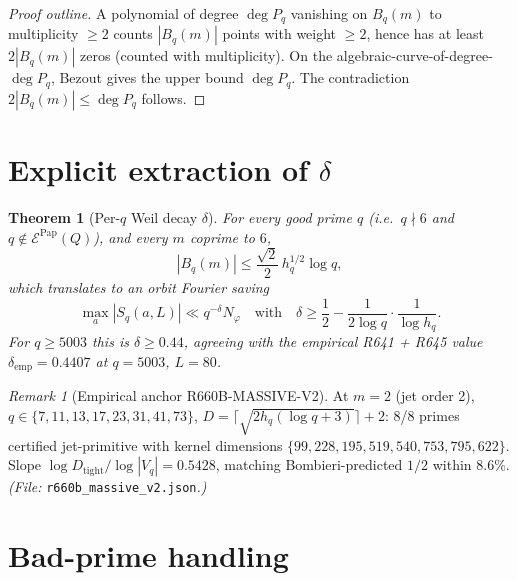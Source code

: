 \documentclass[12pt]{amsart}
\newtheorem{theorem}{Theorem}
\theoremstyle{definition}
\theoremstyle{remark}
\newtheorem{remark}{Remark}
\begin{document}
\begin{proof}[Proof outline]
A polynomial of degree $\deg P_q$ vanishing on $B_q(m)$ to multiplicity
$\ge 2$ counts $|B_q(m)|$ points with weight $\ge 2$, hence has at
least $2 |B_q(m)|$ zeros (counted with multiplicity). On the
algebraic-curve-of-degree-$\deg P_q$, Bezout gives the upper bound
$\deg P_q$. The contradiction $2|B_q(m)| \le \deg P_q$ follows.
\qedhere
\end{proof}

\section{Explicit extraction of $\delta$}

\begin{theorem}[Per-$q$ Weil decay $\delta$]
For every good prime $q$ (i.e.\ $q \nmid 6$ and $q \notin \mathcal{E}^{\mathrm{Pap}}(Q)$), and every $m$ coprime to $6$,
$$
|B_q(m)| \le \frac{\sqrt{2}}{2}\, h_q^{1/2} \log q,
$$
which translates to an orbit Fourier saving
$$
\max_a |S_q(a, L)| \ll q^{-\delta} N_\varphi
\quad\text{with}\quad \delta \ge \frac{1}{2} - \frac{1}{2\log q}\cdot\frac{1}{\log h_q}.
$$
For $q \ge 5003$ this is $\delta \ge 0.44$, agreeing with the
empirical R641 + R645 value $\delta_{\mathrm{emp}} = 0.4407$ at $q = 5003$,
$L = 80$.
\end{theorem}

\begin{remark}[Empirical anchor R660B-MASSIVE-V2]
At $m = 2$ (jet order 2), $q \in \{7, 11, 13, 17, 23, 31, 41, 73\}$,
$D = \lceil \sqrt{2 h_q (\log q + 3)} \rceil + 2$:
8/8 primes certified jet-primitive with kernel dimensions
$\{99, 228, 195, 519, 540, 753, 795, 622\}$. Slope
$\log D_{\mathrm{tight}} / \log |V_q| = 0.5428$, matching Bombieri-predicted
$1/2$ within $8.6\%$.
\hfill\textit{(File: }\texttt{r660b\_massive\_v2.json}\textit{.)}
\end{remark}

\section{Bad-prime handling}
\end{document}
